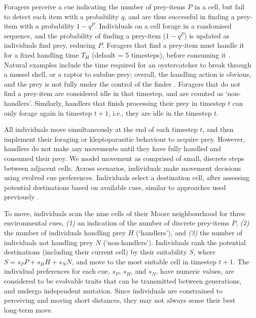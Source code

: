 Foragers perceive a cue indicating the number of prey-items $P$ in a cell, but fail to detect each item with a probability $q$, and are thus successful in finding a prey-item with a probability $1 - q^P$.
Individuals on a cell forage in a randomised sequence, and the probability of finding a prey-item ($1 - q^P$) is updated as individuals find prey, reducing $P$.
Foragers that find a prey-item must handle it for a fixed handling time $T_H$ (default = 5 timesteps), before consuming it \parencite[][]{ruxton1992}.
Natural examples include the time required for an oystercatcher to break through a mussel shell, or a raptor to subdue prey; overall, the handling action is obvious, and the prey is not fully under the control of the finder \parencite{brockmann1979}.
Foragers that do not find a prey-item are considered idle in that timestep, and are counted as `non-handlers'.
Similarly, handlers that finish processing their prey in timestep $t$ can only forage again in timestep $t+1$, i.e., they are idle in the timestep $t$.

All individuals move simultaneously at the end of each timestep $t$, and then implement their foraging or kleptoparasitic behaviour to acquire prey.
However, handlers do not make any movements until they have fully handled and consumed their prey.
We model movement as comprised of small, discrete steps between adjacent cells.
Across scenarios, individuals make movement decisions using evolved cue preferences.
Individuals select a destination cell, after assessing potential destinations based on available cues, similar to approaches used previously \parencite{getz2015,getz2016,white2018,scherer2020,netz2021}.

To move, individuals scan the nine cells of their Moore neighbourhood for three environmental cues, \textit{(1)} an indication of the number of discrete prey-items $P$, \textit{(2)} the number of individuals handling prey $H$ (`handlers'), and \textit{(3)} the number of individuals not handling prey $N$ (`non-handlers').
Individuals rank the potential destinations (including their current cell) by their suitability $S$, where $S = s_PP + s_HH + s_NN$, and move to the most suitable cell in timestep $t+1$.
The individual preferences for each cue, $s_P$, $s_H$, and $s_N$, have numeric values, are considered to be evolvable traits that can be transmitted between generations, and undergo independent mutation.
Since individuals are constrained to perceiving and moving short distances, they may not always sense their best long-term move.

